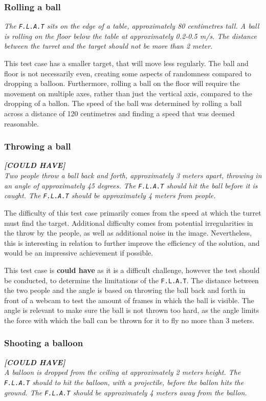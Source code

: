 \subsubsection{Rolling a ball}
\textit{The \texttt{F.L.A.T} sits on the edge of a table, approximately 80 centimetres tall.
A ball is rolling on the floor below the table at approximately 0.2-0.5 m/s.
The distance between the turret and the target should not be more than 2 meter.}

This test case has a smaller target, that will move less regularly.
The ball and floor is not necessarily even, creating some aspects of randomness compared to dropping a balloon.
Furthermore, rolling a ball on the floor will require the movement on multiple axes, rather than just the vertical axis, compared to the dropping of a ballon.
The speed of the ball was determined by rolling a ball across a distance of 120 centimetres and finding a speed that was deemed reasonable.

\subsubsection{Throwing a ball}
\textit{\textbf{[COULD HAVE]}}\\
\textit{Two people throw a ball back and forth, approximately 3 meters apart, throwing in an angle of approximately 45 degrees.
The \texttt{F.L.A.T} should hit the ball before it is caught.
The \texttt{F.L.A.T} should be approximately 4 meters from people.}

The difficulty of this test case primarily comes from the speed at which the turret must find the target.
Additional difficulty comes from potential irregularities in the throw by the people, as well as additional noise in the image.
Nevertheless, this is interesting in relation to further improve the efficiency of the solution, and would be an impressive achievement if possible.

This test case is \textbf{could have} as it is a difficult challenge, however the test should be conducted, to determine the limitations of the \texttt{F.L.A.T}.
The distance between the two people and the angle is based on throwing the ball back and forth in front of a webcam to test the amount of frames in which the ball is visible.
The angle is relevant to make sure the ball is not thrown too hard, as the angle limits the force with which the ball can be thrown for it to fly no more than 3 meters.

\subsubsection{Shooting a balloon}
\textit{\textbf{[COULD HAVE]}}\\
\textit{A balloon is dropped from the ceiling at approximately 2 meters height.
The \texttt{F.L.A.T} should to hit the balloon, with a projectile, before the ballon hits the ground.
The \texttt{F.L.A.T} should be approximately 4 meters away from the ballon.}

